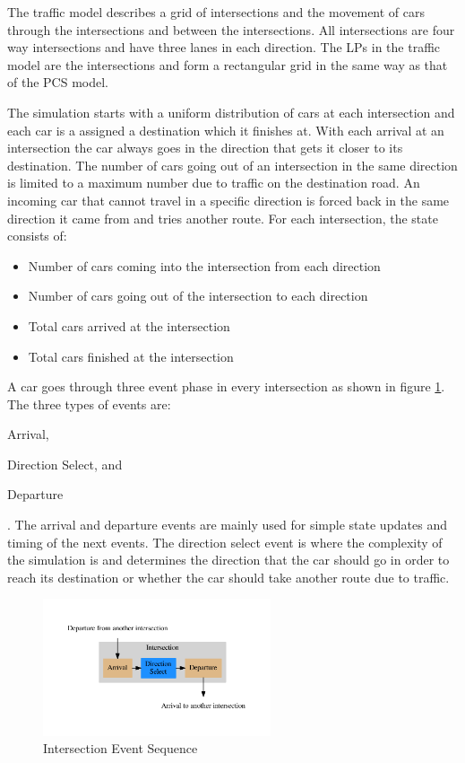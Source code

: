 \documentclass[11pt]{book}
\begin{document}
The traffic model describes a grid of intersections and the movement of cars through
the intersections and between the intersections.  All intersections are four way intersections
and have three lanes in each direction.  The LPs in the traffic model are the intersections
and form a rectangular grid in the same way as that of the PCS model.

The simulation starts with a uniform distribution of cars at each intersection and each
car is a assigned a destination which it finishes at.  With each arrival at an intersection
the car always goes in the direction that gets it closer to its destination.
The number of cars going out of an intersection in the same direction is limited to a
maximum number due to traffic on the destination road.  An incoming car that cannot travel in
a specific direction is forced back in the same direction it came from and tries another
route.  For each intersection, the state consists of:

\begin{itemize}
    \item Number of cars coming into the intersection from each direction
    \item Number of cars going out of the intersection to each direction
    \item Total cars arrived at the intersection
    \item Total cars finished at the intersection
\end{itemize}

A car goes through three event phase in every intersection as shown in figure
\ref{traffic_events}.  The three types of events are: \begin{inparaenum}[(1)] \item Arrival,
\item Direction Select, and \item Departure \end{inparaenum}.  The arrival and departure
events are mainly used for simple state updates and timing of the next events.
The direction select event is where the complexity of the simulation is and determines the
direction that the car should go in order to reach its destination or whether the car should
take another route due to traffic.

\begin{figure}
    \centering
    \includegraphics[width=0.6\textwidth,quiet]{figs/graphviz/traffic_events.pdf}
    \caption{Intersection Event Sequence}\label{traffic_events}
\end{figure}
\end{document}
